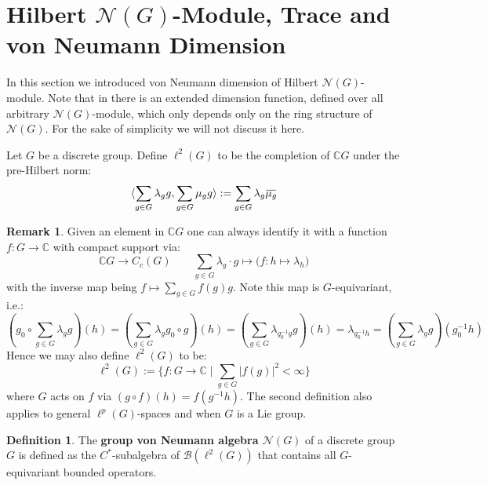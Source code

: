 \documentclass[11pt]{report}
\theoremstyle{definition}
\newtheorem{Def}{Definition}[chapter]
\newtheorem{Rmk}{Remark}[chapter]
\theoremstyle{plain}
\newcommand{\complex}{\mathbb{C}}
\newcommand{\bdd}{\mathcal{B}}
\newcommand{\vna}{\mathcal{N}}
\newcommand{\overbar}[1]{\mkern 1.5mu\overline{\mkern-1.5mu#1\mkern-1.5mu}\mkern 1.5mu}
\newcommand{\brac}[1]{\langle #1 \rangle}
\renewcommand{\bar}{\overbar}
\begin{document}
\section{Hilbert $\vna(G)$-Module, Trace and von Neumann Dimension}
In this section we introduced von Neumann dimension of Hilbert $\vna(G)$-module. Note that in \cite[Chapter~6.1]{luck2013} there is an extended dimension function, defined over all arbitrary $\vna(G)$-module, which only depends only on the ring structure of $\vna(G)$. For the sake of simplicity we will not discuss it here.
\par Let $G$ be a discrete group. Define $\ell^2(G)$ to be the completion of $\complex G$ under the pre-Hilbert norm:
\begin{equation}
\brac{\sum_{g\in G}\lambda_gg, \sum_{g\in G}\mu_gg}:=\sum_{g\in G}\lambda_g\bar{\mu_g}
\end{equation}
\begin{Rmk}\label{ell2fct}
Given an element in $\complex G$ one can always identify it with a function $f:G\to \complex$ with compact support via:
	\begin{equation}
	 	\complex G\longrightarrow C_c(G)\qquad 
	 	\sum_{g\in G}\lambda_g\cdot g\longmapsto \Big(f: h\mapsto \lambda_{h}\Big)
	 	\end{equation}
with the inverse map being $f\mapsto \sum_{g\in G}f(g)g$. Note this map is $G$-equivariant, i.e.:
\begin{equation*}
	 (g_0\circ\sum_{g\in G}\lambda_g g)(h)=(\sum_{g\in G}\lambda_{g}g_0\circ g)(h)=(\sum_{g\in G}\lambda_{g_0^{-1}g}g)(h)=\lambda_{g_0^{-1}h}=(\sum_{g\in G}\lambda_g g)(g_0^{-1}h)
\end{equation*}
Hence we may also define $\ell^2(G)$ to be:
\begin{equation}
\ell^2(G):=\Big\{f:G\to \complex\mid \sum_{g\in G}|f(g)|^2<\infty\Big\}
\end{equation}
where $G$ acts on $f$ via $(g\circ f)(h)=f(g^{-1}h)$. The second definition also applies to general $\ell^p(G)$-spaces and when $G$ is a Lie group.
\end{Rmk}
\begin{Def}
The \textbf{group von Neumann algebra $\vna(G)$} of a discrete group $G$ is defined as the $C^*$-subalgebra of $\bdd(\ell^2(G))$ that contains all $G$-equivariant bounded operators.
\end{Def}
\end{document}
